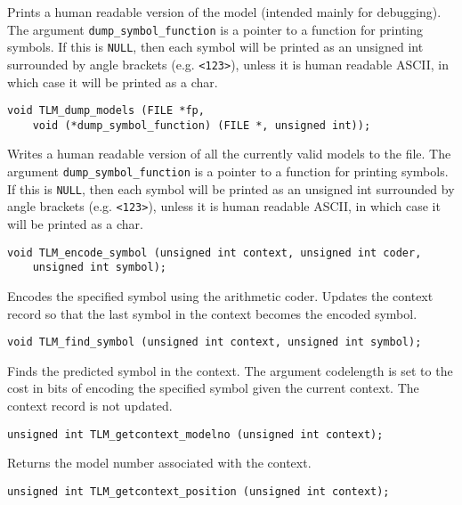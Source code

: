 \documentclass[11pt]{article}
\begin{document}
{\vspace{-0.2cm}
Prints a human readable version of the model (intended mainly for debugging).
The argument \verb|dump_symbol_function| is a pointer to a function for printing symbols.
If this is \verb|NULL|, then each symbol will be printed as an unsigned int surrounded by
angle brackets (e.g. \verb|<123>|), unless it is human readable ASCII, in which case it will
be printed as a char.

\begin{verbatim}
void TLM_dump_models (FILE *fp,
    void (*dump_symbol_function) (FILE *, unsigned int));
\end{verbatim}

\vspace{-0.2cm}
Writes a human readable version of all the currently valid models to the file.
The argument \verb|dump_symbol_function| is a pointer to a function for printing symbols.
If this is \verb|NULL|, then each symbol will be printed as an unsigned int surrounded by
angle brackets (e.g. \verb|<123>|), unless it is human readable ASCII, in which case it will
be printed as a char.

\begin{verbatim}
void TLM_encode_symbol (unsigned int context, unsigned int coder,
    unsigned int symbol);
\end{verbatim}

\vspace{-0.2cm}
Encodes the specified symbol using the arithmetic coder. Updates the context record so
that the last symbol in the context becomes the encoded symbol.

\begin{verbatim}
void TLM_find_symbol (unsigned int context, unsigned int symbol);
\end{verbatim}

\vspace{-0.2cm}
Finds the predicted symbol in the context. The argument codelength is set to
the cost in bits of encoding the specified symbol given the current context. The context
record is not updated.

\begin{verbatim}
unsigned int TLM_getcontext_modelno (unsigned int context);
\end{verbatim}

\vspace{-0.2cm}
Returns the model number associated with the context.

\begin{verbatim}
unsigned int TLM_getcontext_position (unsigned int context);
\end{verbatim}

}
\end{document}
